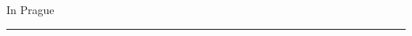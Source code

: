 
\begin{declaration}
\vspace{0.4cm}

\vspace{5em}
In Prague  \hfill \rule[-0.15em]{13em}{0.5pt} %
 

\end{declaration}

\cleardoublepage